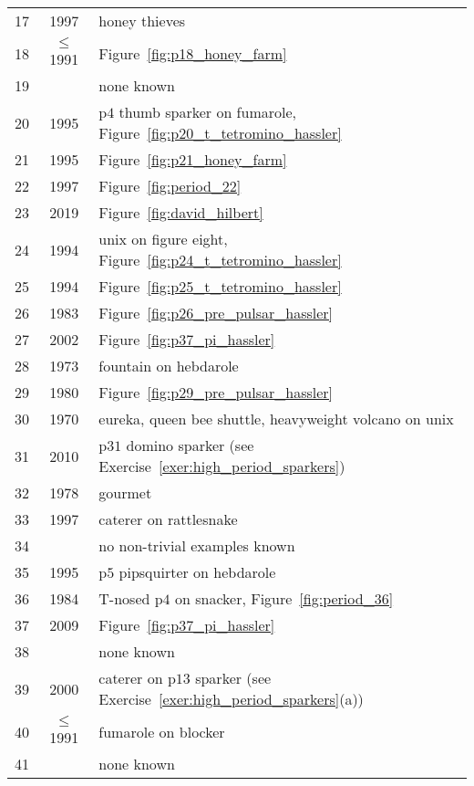 \begin{table}[!htb]
\begin{center}
\begin{tabular}{c c l}
			\rowcolor{gray!20} 17 & 1997 & honey thieves \\
			18 & $\leq$1991 & Figure~\ref{fig:p18_honey_farm} \\
			\rowcolor{redback!50} 19 & & none known \\
			20 & 1995 & p$4$ thumb sparker on fumarole, Figure~\ref{fig:p20_t_tetromino_hassler} \\
			\rowcolor{gray!20} 21 & 1995 & Figure~\ref{fig:p21_honey_farm} \\
			22 & 1997 & Figure~\ref{fig:period_22} \\
			\rowcolor{gray!20} 23 & 2019 & Figure~\ref{fig:david_hilbert} \\
			24 & 1994 & unix on figure eight, Figure~\ref{fig:p24_t_tetromino_hassler} \\
			\rowcolor{gray!20} 25 & 1994 & Figure~\ref{fig:p25_t_tetromino_hassler} \\
			26 & 1983 & Figure~\ref{fig:p26_pre_pulsar_hassler} \\
			\rowcolor{gray!20} 27 & 2002 & Figure~\ref{fig:p37_pi_hassler} \\
			28 & 1973 & fountain on hebdarole \\
			\rowcolor{gray!20} 29 & 1980 & Figure~\ref{fig:p29_pre_pulsar_hassler} \\
			30 & 1970 & eureka, queen bee shuttle, heavyweight volcano on unix \\
			\rowcolor{gray!20} 31 & 2010 & p$31$ domino sparker (see Exercise~\ref{exer:high_period_sparkers})\\
			32 & 1978 & gourmet \\
			\rowcolor{gray!20} 33 & 1997 & caterer on rattlesnake \\
			\rowcolor{redback!50} 34 & & no non-trivial examples known \\
			\rowcolor{gray!20} 35 & 1995 & p$5$ pipsquirter on hebdarole \\
			36 & 1984 & T-nosed p$4$ on snacker, Figure~\ref{fig:period_36} \\
			\rowcolor{gray!20} 37 & 2009 & Figure~\ref{fig:p37_pi_hassler} \\
			\rowcolor{redback!50} 38 & & none known \\
			\rowcolor{gray!20} 39 & 2000 & caterer on p$13$ sparker (see Exercise~\ref{exer:high_period_sparkers}(a)) \\
			40 & $\leq$1991 & fumarole on blocker \\
			\rowcolor{redback!50} 41 & & none known \\

\end{tabular}
\end{center}
\end{table}
